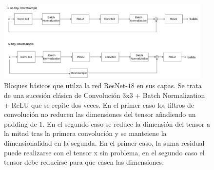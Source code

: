             \begin{figure}[htbp]
                \centering
                \includegraphics[width=0.95\textwidth]{img/bloque_basico_encoder.png}
                \caption{Bloques básicos que utilza la red ResNet-$18$ en sus capas. Se trata de una sucesión clásica de Convolución 3x3 + Batch Normalization + ReLU que se repite dos veces. En el primer caso los filtros de convolución no reducen las dimensiones del tensor añadiendo un padding de 1. En el segundo caso se reduce la dimensión del tensor a la mitad tras la primera convolución y se manteiene la dimensionalidad en la segunda. En el primer caso, la suma residual puede realizarse con el tensor x sin problema, en el segundo caso el tensor debe reducirse para que casen las dimensiones.}
                \label{fig:bloque_encoder}
            \end{figure}

